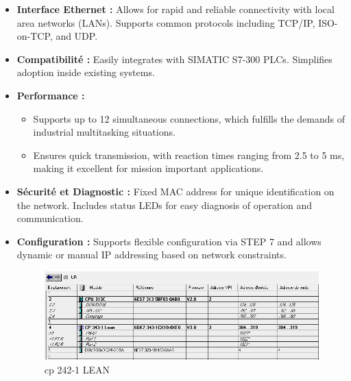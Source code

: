 \begin{itemize} 
\item \textbf{Interface Ethernet :} Allows for rapid and reliable connectivity with local area networks (LANs). Supports common protocols including TCP/IP, ISO-on-TCP, and UDP.

\item \textbf{Compatibilité :} Easily integrates with SIMATIC S7-300 PLCs. Simplifies adoption inside existing systems.
\item \textbf{Performance :}
\begin{itemize} 
\item Supports up to 12 simultaneous connections, which fulfills the demands of industrial multitasking situations.
\item Ensures quick transmission, with reaction times ranging from 2.5 to 5 ms, making it excellent for mission important applications.

\end{itemize} 
\item \textbf{Sécurité et Diagnostic :} Fixed MAC address for unique identification on the network.
Includes status LEDs for easy diagnosis of operation and communication.
\item \textbf{Configuration :} Supports flexible configuration via STEP 7 and allows dynamic or manual IP addressing based on network constraints.
\begin{figure}[H]
    \centering
    \includegraphics[width=1\textwidth]{chapters/5/img/cp343.png}
    \caption{cp 242-1 LEAN}
    \label{fig:campus}
\end{figure}


\end{itemize}